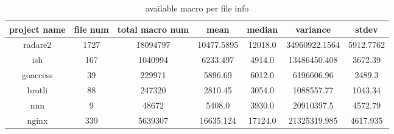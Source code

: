 \begin{table}[h]
	\caption{available macro per file info}
	\label{table:available_macro_info}	
		\begin{tabular}{ccccccc}
		\hline
		project name & file num & total macro num & mean & median & variance & stdev \\ 
		\hline \hline
		radare2 & 1727 & 18094797 & 10477.5895 & 12018.0 & 34960922.1564 & 5912.7762 \\ 
		\hline
		ish & 167 & 1040994 & 6233.497 & 4914.0 & 13486450.408 & 3672.39 \\ 
		\hline
		goaccess & 39 & 229971 & 5896.69 & 6012.0 & 6196606.96 & 2489.3 \\ 
		\hline
		brotli & 88 & 247320 & 2810.45 & 3054.0 & 1088557.77 & 1043.34 \\ 
		\hline
		nnn & 9 & 48672 & 5408.0 & 3930.0 & 20910397.5 & 4572.79 \\ 
		\hline
		nginx & 339 & 5639307 & 16635.124 & 17124.0 & 21325319.985 & 4617.935 \\ 
		\hline
	\end{tabular}
\end{table}